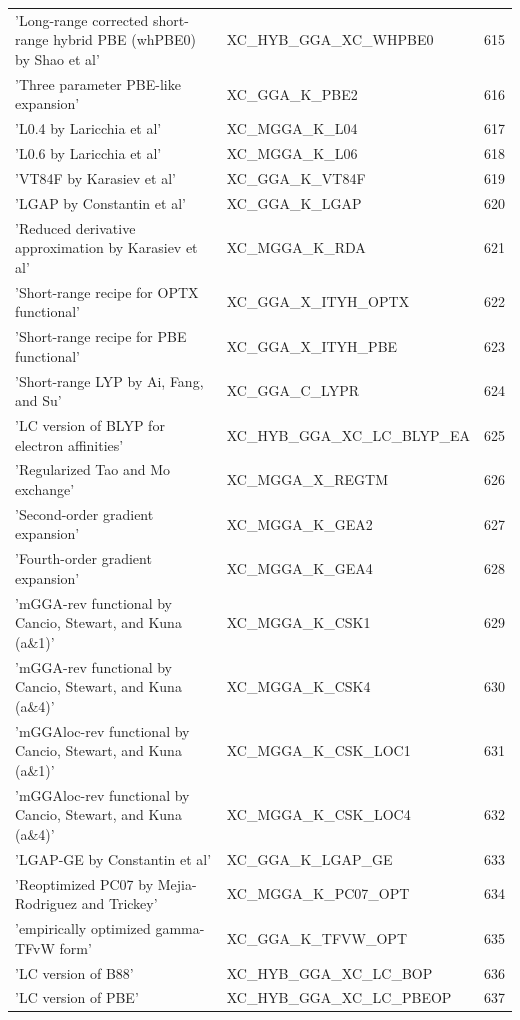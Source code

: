 \documentclass[final,12pt,makeidx,DIV=calc]{article}
\begin{document}
{{{\begin{table}[!h]
\begin{center}
\begin{tabular}{llr}
  'Long-range corrected short-range hybrid PBE (whPBE0) by Shao et al' & XC\_HYB\_GGA\_XC\_WHPBE0  &615\\
  'Three parameter PBE-like expansion' & XC\_GGA\_K\_PBE2  &616\\
  'L0.4 by Laricchia et al' & XC\_MGGA\_K\_L04  &617\\
  'L0.6 by Laricchia et al' & XC\_MGGA\_K\_L06  &618\\
  'VT84F by Karasiev et al' & XC\_GGA\_K\_VT84F  &619\\
  'LGAP by Constantin et al' & XC\_GGA\_K\_LGAP  &620\\
  'Reduced derivative approximation by Karasiev et al' & XC\_MGGA\_K\_RDA  &621\\
  'Short-range recipe for OPTX functional' & XC\_GGA\_X\_ITYH\_OPTX  &622\\
  'Short-range recipe for PBE functional' & XC\_GGA\_X\_ITYH\_PBE  &623\\
  'Short-range LYP by Ai, Fang, and Su' & XC\_GGA\_C\_LYPR  &624\\
  'LC version of BLYP for electron affinities' & XC\_HYB\_GGA\_XC\_LC\_BLYP\_EA  &625\\
  'Regularized Tao and Mo exchange' & XC\_MGGA\_X\_REGTM  &626\\
  'Second-order gradient expansion' & XC\_MGGA\_K\_GEA2  &627\\
  'Fourth-order gradient expansion' & XC\_MGGA\_K\_GEA4  &628\\
  'mGGA-rev functional by Cancio, Stewart, and Kuna (a\&1)' & XC\_MGGA\_K\_CSK1  &629\\
  'mGGA-rev functional by Cancio, Stewart, and Kuna (a\&4)' & XC\_MGGA\_K\_CSK4  &630\\
  'mGGAloc-rev functional by Cancio, Stewart, and Kuna (a\&1)' & XC\_MGGA\_K\_CSK\_LOC1  &631\\
  'mGGAloc-rev functional by Cancio, Stewart, and Kuna (a\&4)' & XC\_MGGA\_K\_CSK\_LOC4  &632\\
  'LGAP-GE by Constantin et al' & XC\_GGA\_K\_LGAP\_GE  &633\\
  'Reoptimized PC07 by Mejia-Rodriguez and Trickey' & XC\_MGGA\_K\_PC07\_OPT  &634\\
  'empirically optimized gamma-TFvW form' & XC\_GGA\_K\_TFVW\_OPT  &635\\
  'LC version of B88' & XC\_HYB\_GGA\_XC\_LC\_BOP  &636\\
  'LC version of PBE' & XC\_HYB\_GGA\_XC\_LC\_PBEOP  &637\\

\end{tabular}
\end{center}
\end{table}}}}
\end{document}

